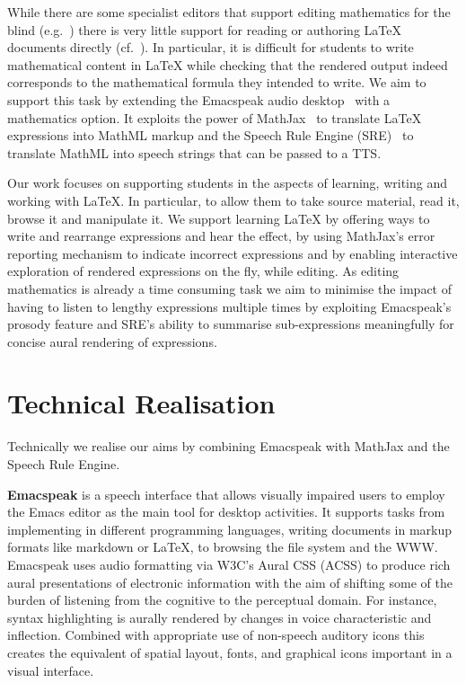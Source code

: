 \documentclass{sig-alternate-05-2015}
\begin{document}
While there are some specialist editors that support editing mathematics for the
blind (e.g.~\cite{Pearson}) there is very little support for reading or
authoring {\LaTeX} documents directly (cf.~\cite{ncbys}). In particular, it is
difficult for students to write mathematical content in {\LaTeX} while checking
that the rendered output indeed corresponds to the mathematical formula they
intended to write. We aim to support this task by extending the Emacspeak audio
desktop~\cite{Emacspeak} with a mathematics option. It exploits the power of
MathJax~\cite{MathJax2.6} to translate {\LaTeX} expressions into MathML markup
and the Speech Rule Engine (SRE)~\cite{SRE} to translate MathML into speech
strings that can be passed to a TTS.

Our work focuses on supporting students in the aspects of learning, writing and
working with {\LaTeX}. In particular, to allow them to take source material,
read it, browse it and manipulate it. We support learning {\LaTeX} by offering
ways to write and rearrange expressions and hear the effect, by using MathJax's
error reporting mechanism to indicate incorrect expressions and by enabling
interactive exploration of rendered expressions on the fly, while editing.  As
editing mathematics is already a time consuming task we aim to minimise the
impact of having to listen to lengthy expressions multiple times by exploiting
Emacspeak's prosody feature and SRE's ability to summarise sub-expressions
meaningfully for concise aural rendering of expressions.


\section{Technical Realisation}
\label{sec:background}

Technically we realise our aims by combining Emacspeak with MathJax and the
Speech Rule Engine.

\textbf{Emacspeak} is a speech interface that allows visually impaired users to
employ the Emacs editor as the main tool for desktop activities. It supports
tasks from implementing in different programming languages, writing documents in
markup formats like markdown or {\LaTeX}, to browsing the file system and the
WWW. Emacspeak uses audio formatting via W3C's Aural CSS (ACSS) to produce rich
aural presentations of electronic information with the aim of shifting some of
the burden of listening from the cognitive to the perceptual domain. For
instance, syntax highlighting is aurally rendered by changes in voice
characteristic and inflection. Combined with appropriate use of non-speech
auditory icons this creates the equivalent of spatial layout, fonts, and
graphical icons important in a visual interface.
\end{document}
